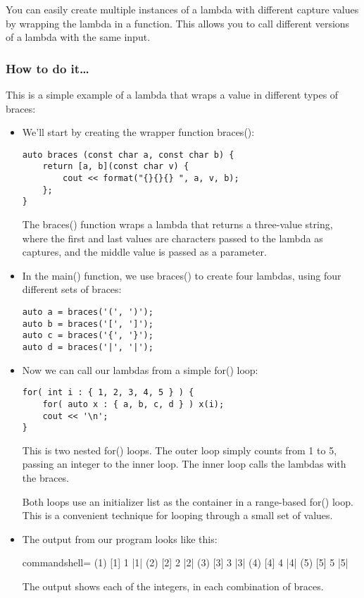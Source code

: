 
You can easily create multiple instances of a lambda with different capture values by wrapping the lambda in a function. This allows you to call different versions of a lambda with the same input.

\subsubsection{How to do it…}

This is a simple example of a lambda that wraps a value in different types of braces:

\begin{itemize}
\item 
We'll start by creating the wrapper function braces():

\begin{lstlisting}[style=styleCXX]
auto braces (const char a, const char b) {
	return [a, b](const char v) {
		cout << format("{}{}{} ", a, v, b);
	};
}
\end{lstlisting}

The braces() function wraps a lambda that returns a three-value string, where the first and last values are characters passed to the lambda as captures, and the middle value is passed as a parameter.

\item 
In the main() function, we use braces() to create four lambdas, using four different sets of braces:

\begin{lstlisting}[style=styleCXX]
auto a = braces('(', ')');
auto b = braces('[', ']');
auto c = braces('{', '}');
auto d = braces('|', '|');
\end{lstlisting}

\item 
Now we can call our lambdas from a simple for() loop:

\begin{lstlisting}[style=styleCXX]
for( int i : { 1, 2, 3, 4, 5 } ) {
	for( auto x : { a, b, c, d } ) x(i);
	cout << '\n';
}
\end{lstlisting}

This is two nested for() loops. The outer loop simply counts from 1 to 5, passing an integer to the inner loop. The inner loop calls the lambdas with the braces.

Both loops use an initializer list as the container in a range-based for() loop. This is a convenient technique for looping through a small set of values.

\item 
The output from our program looks like this:

\begin{tcblisting}{commandshell={}}
(1) [1] {1} |1|
(2) [2] {2} |2|
(3) [3] {3} |3|
(4) [4] {4} |4|
(5) [5] {5} |5|
\end{tcblisting}

The output shows each of the integers, in each combination of braces.
\end{itemize}

